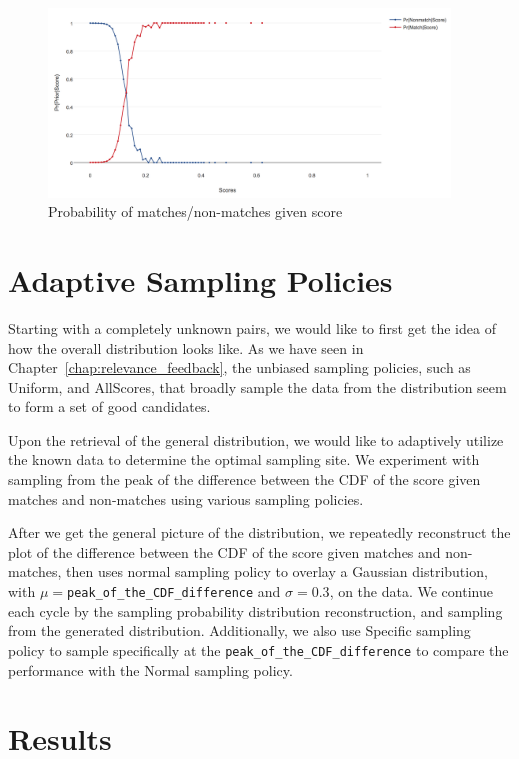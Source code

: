 \begin{figure}[ht]
  \centering
  \includegraphics[width=0.95\textwidth]{dataset/otago/pms}
  \caption{Probability of matches/non-matches given score}
  \label{fig:otago_pms}
\end{figure}

\section{Adaptive Sampling Policies} %
\label{sec:sampling_policies}

Starting with a completely unknown pairs, we would like to first get the idea
of how the overall distribution looks like. As we have seen in
Chapter~\ref{chap:relevance_feedback}, the unbiased sampling policies, such as
Uniform, and AllScores, that broadly sample the data from the distribution seem
to form a set of good candidates.

Upon the retrieval of the general distribution, we would like to adaptively
utilize the known data to determine the optimal sampling site. We experiment
with sampling from the peak of the difference between the CDF of the score
given matches and non-matches using various sampling policies.

After we get the general picture of the distribution, we repeatedly reconstruct
the plot of the difference between the CDF of the score given matches and
non-matches, then uses normal sampling policy to overlay a Gaussian
distribution, with $\mu=$\texttt{peak\_of\_the\_CDF\_difference} and
$\sigma=0.3$, on the data. We continue each cycle by the sampling probability
distribution reconstruction, and sampling from the generated distribution.
Additionally, we also use Specific sampling policy to sample specifically at the
\texttt{peak\_of\_the\_CDF\_difference} to compare the performance with the
Normal sampling policy.

\section{Results}

